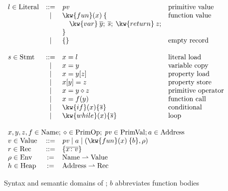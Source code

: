 \begin{figure}
\[\begin{array}{lcll}
l \in \Literal & ::= & \mathit{pv} & \text{primitive value} \\
            & \mid & \kw{fun}(x)\>\{ & \text{function value} \\
            &      & \quad\kw{var}\>\overline{y};\>\overline{s};\>\kw{return}\>z;\\
            &      & \} \\
            & \mid & \{\} & \text{empty record} \\
\\
s \in \Stmt & ::=  & x = l & \text{literal load} \\
            & \mid & x = y & \text{variable copy} \\
            & \mid & x = y[z] & \text{property load} \\
            & \mid & x[y] = z & \text{property store} \\
            & \mid & x = y \diamond z & \text{primitive operator} \\
            & \mid & x = f(y) & \text{function call} \\
            & \mid & \kw{if}(x) \{ \overline{s} \} & \text{conditional} \\
            & \mid & \kw{while}(x) \{ \overline{s} \} & \text{loop} \\
\\
\multicolumn{4}{l}{x,y,z,f\in\Name;\>\diamond \in \PrimOp;\>\mathit{pv} \in \PrimVal; a \in \Address} \\
v \in \Value & ::= & \multicolumn{2}{l}{\mathit{pv} \mid a \mid (\kw{fun}(x)\>\{b\}, \rho)} \\
r \in \Record & ::= & \{\overline{x\colon v}\} \\
\rho \in \Env & := & \Name \rightharpoonup \Value \\
h \in \Heap & := & \Address \rightharpoonup \Record \\
\end{array}\]
\caption{Syntax and semantic domains of \muJS; $b$ abbreviates function bodies}\label{fig:concrete-domains}
\end{figure}
